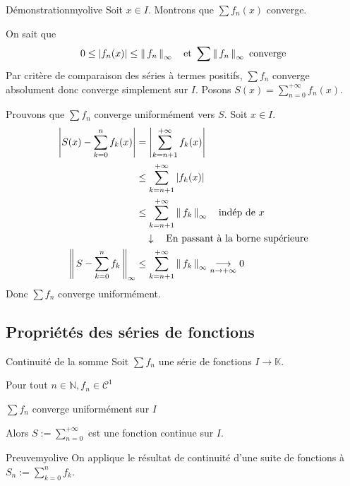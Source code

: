     \begin{demo}{Démonstration}{myolive}
        Soit $x \in I$. Montrons que $\sum f_n(x)$ converge. 

        On sait que 
        \[ 0 \leq \left\lvert f_n(x)\right\rvert \leq \left\lVert\,f_n\,\right\rVert_{\infty} \quad \text{et } \sum \left\lVert\,f_n\,\right\rVert_{\infty} \text{ converge} \] 
        Par critère de comparaison des séries à termes positifs, $\sum f_n$ converge absolument donc converge simplement sur $I$. Posons $S(x) = \sum_{n=0}^{+\infty} f_n(x)$. 

        Prouvons que $\sum f_n$ converge uniformément vers $S$. Soit $x \in I$.
        \begin{align*}
            \left\lvert S(x) - \sum_{k=0}^{n} f_k(x)\right\rvert 
            &= \left\lvert \sum_{k=n+1}^{+\infty} f_k(x)\right\rvert \\
            &\leq \sum_{k=n+1}^{+\infty} \left\lvert f_k(x)\right\rvert \\
            &\leq \sum_{k=n+1}^{+\infty} \left\lVert\,f_k\,\right\rVert_{\infty} \quad \text{indép de } x \\
            & \quad \downarrow \quad \text{En passant à la borne supérieure} \\
            \left\lVert\,S - \sum_{k=0}^{n} f_k\,\right\rVert_{\infty} 
            &\leq \sum_{k=n+1}^{+\infty} \left\lVert\,f_k\,\right\rVert_{\infty} \underset{n \rightarrow +\infty}{\longrightarrow} 0
        \end{align*}
        Donc $\sum f_n$ converge uniformément.
    \end{demo}

\subsection{Propriétés des séries de fonctions}

    \begin{prop}{Continuité de la somme}{}
        Soit $\sum f_n$ une série de fonctions $I \rightarrow \mathbb{K}$. 
        \begin{suppose}
            \item Pour tout $n \in \mathbb{N}, f_n \in \mathcal{C}^1$
            \item $\sum f_n$ converge uniformément sur $I$
        \end{suppose}
        Alors $S := \sum_{n=0}^{+\infty}$ est une fonction continue sur $I$.
    \end{prop}

    \begin{demo}{Preuve}{myolive}
        On applique le résultat de continuité d’une suite de fonctions à $S_n := \sum_{k=0}^n f_k$.
    \end{demo}

